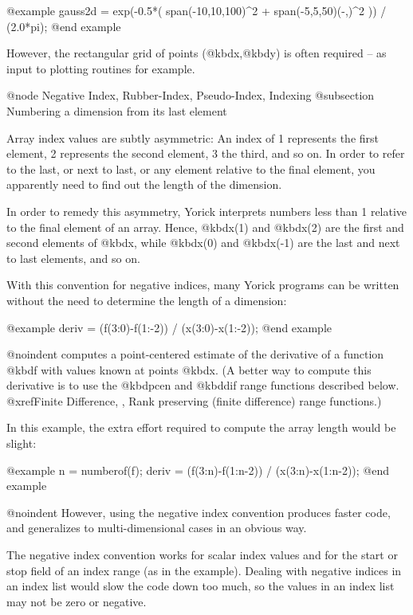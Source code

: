 @example
gauss2d = exp(-0.5*( span(-10,10,100)^2 +
                     span(-5,5,50)(-,)^2 )) / (2.0*pi);
@end example

However, the rectangular grid of points (@kbd{x},@kbd{y}) is often
required -- as input to plotting routines for example.



@node    Negative Index, Rubber-Index, Pseudo-Index, Indexing
@subsection Numbering a dimension from its last element

Array index values are subtly asymmetric: An index of 1 represents the
first element, 2 represents the second element, 3 the third, and so on.
In order to refer to the last, or next to last, or any element relative
to the final element, you apparently need to find out the length of the
dimension.

In order to remedy this asymmetry, Yorick interprets numbers less than 1
relative to the final element of an array.  Hence, @kbd{x(1)} and
@kbd{x(2)} are the first and second elements of @kbd{x}, while
@kbd{x(0)} and @kbd{x(-1)} are the last and next to last elements, and
so on.

With this convention for negative indices, many Yorick programs can
be written without the need to determine the length of a dimension:

@example
deriv = (f(3:0)-f(1:-2)) / (x(3:0)-x(1:-2));
@end example

@noindent
computes a point-centered estimate of the derivative of a function
@kbd{f} with values known at points @kbd{x}.  (A better way to compute
this derivative is to use the @kbd{pcen} and @kbd{dif} range functions
described below.  @xref{Finite Difference, , Rank preserving (finite
difference) range functions}.)

In this example, the extra effort required to compute the array length
would be slight:

@example
n = numberof(f);
deriv = (f(3:n)-f(1:n-2)) / (x(3:n)-x(1:n-2));
@end example

@noindent
However, using the negative index convention produces faster code, and
generalizes to multi-dimensional cases in an obvious way.

The negative index convention works for scalar index values and for the
start or stop field of an index range (as in the example).  Dealing with
negative indices in an index list would slow the code down too much, so
the values in an index list may not be zero or negative.



